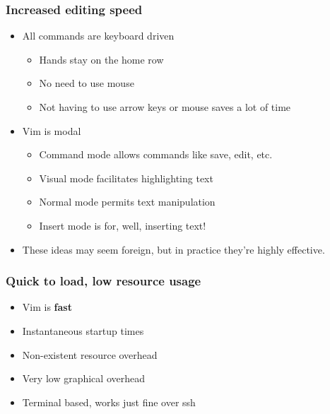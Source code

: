\documentclass{beamer}
\begin{document}
\begin{frame}
    \frametitle{Increased editing speed}
    \begin{itemize}
	\item All commands are keyboard driven
	\begin{itemize}
	    \item Hands stay on the home row
	    \item No need to use mouse
	    \item Not having to use arrow keys or mouse saves a lot of time
	\end{itemize}
	\item Vim is modal
	\begin{itemize}
	    \item Command mode allows commands like save, edit, etc.
	    \item Visual mode facilitates highlighting text
	    \item Normal mode permits text manipulation
	    \item Insert mode is for, well, inserting text!
	\end{itemize}
    \item These ideas may seem foreign, but in practice they're highly
	effective.
    \end{itemize}
\end{frame}

\begin{frame}
    \frametitle{Quick to load, low resource usage}
    \begin{itemize}
	\item Vim is {\bf fast}
	\item Instantaneous startup times
	\item Non-existent resource overhead
	\item Very low graphical overhead
	\item Terminal based, works just fine over ssh
    \end{itemize}
\end{frame}
\end{document}
